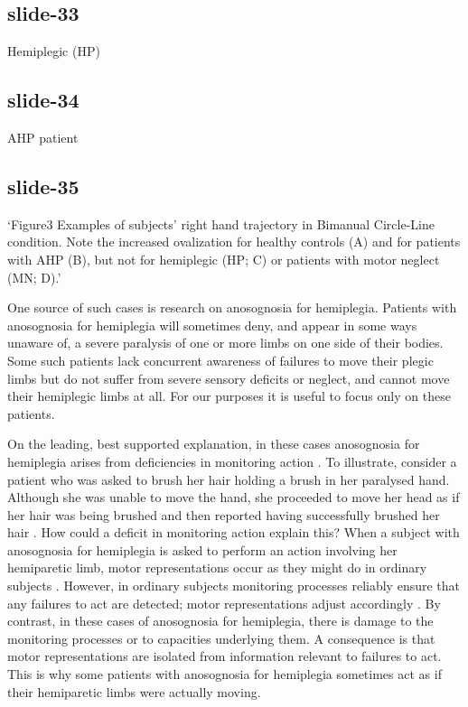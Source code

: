 \documentclass[12pt,\papersize]{extarticle}
\begin{document}
\subsection{slide-33}
Hemiplegic (HP)

\subsection{slide-34}
AHP patient

\subsection{slide-35}
‘Figure3
Examples of subjects’ right hand trajectory in Bimanual Circle-Line condition.
Note the increased ovalization for healthy controls (A) and for patients with AHP (B), but not for
hemiplegic (HP; C) or patients with motor neglect (MN; D).’

One source of such cases is research on anosognosia for hemiplegia. Patients with anosognosia for
hemiplegia will sometimes deny, and appear in some ways unaware of, a severe paralysis of one or
more limbs on one side of their bodies. Some such patients lack concurrent awareness of failures to
move their plegic limbs but do not suffer from severe sensory deficits or neglect, and cannot move
their hemiplegic limbs at all. For our purposes it is useful to focus only on these patients.

On the leading, best supported explanation, in these cases anosognosia for hemiplegia arises from deficiencies in monitoring action \citep{berti:2005_shared,berti:2008_motor}.
To illustrate, consider a patient who was asked to brush her hair holding a brush in her paralysed hand. Although she was unable to move the hand, she proceeded to move her head as if her hair was being brushed and then reported having successfully brushed her hair \citep[pp.\ 173--4]{berti:2008_motor}.
How could a deficit in monitoring action explain this?  When a subject with anosognosia for hemiplegia is asked to perform an action involving her hemiparetic limb, motor representations occur as they might do in ordinary subjects \citep{berti:2005_shared,garbarini:2012_moving}.
However, in ordinary subjects monitoring processes reliably ensure that any failures to act are detected; motor representations adjust accordingly \citep{Haggard:2005sc}.
By contrast, in these cases of anosognosia for hemiplegia, there is damage to the monitoring processes or to capacities underlying them.
A consequence is that motor representations are isolated from information relevant to failures to act.
This is why some patients with anosognosia for hemiplegia sometimes act as if their hemiparetic limbs were actually moving.
\end{document}
